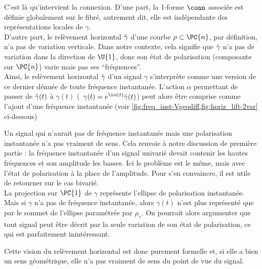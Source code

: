 C'est là qu'intervient la connexion. D'une part, la 1-forme $\conn$ associée est définie globalement sur le fibré, autrement dit, elle est indépendante des représentations locales de $\gamma$.
\\
D'autre part, le relèvement horizontal $\Tilde{\gamma}$ d'une courbe $\rho\subset\PC{n}$, par définition, n'a pas de variation verticale. Dans notre contexte, cela signifie que $\Tilde{\gamma}$ n'a pas de variation dans la direction de $\U{1}$, donc son état de polarisation (composante sur $\PC{n}$) varie mais pas ses ``fréquences''.
\\
Ainsi, le relèvement horizontal $\Tilde{\gamma}$ d'un signal $\gamma$ s'interprète comme une version de ce dernier dénuée de toute fréquence instantanée.
L'action $\alpha$ permettant de passer de $\Tilde{\gamma}(t)$ à $\gamma(t)$ (\ie~$\gamma(t) = e^{\i \alpha(t)} \Tilde{\gamma}(t)$) peut alors être comprise comme l'ajout d'une fréquence instantanée (voir \cref{fig:freq_inst-Vgeodiff,fig:horiz_lift-2var} ci-dessous)	
\\

\begin{remarque}
Un signal qui n'aurait pas de fréquence instantanée mais une polarisation instantanée n'a pas vraiment de sens. 
Cela renvoie à notre discussion de première partie : la fréquence instantanée d'un signal univarié devait contenir les hautes fréquences et son amplitude les basses.
Ici le problème est le même, mais avec l'état de polarisation à la place de l’amplitude. Pour s'en convaincre, il est utile de retourner sur le cas bivarié.
\\
La projection sur $\PC{1}$ de $\gamma$ représente l'ellipse de polarisation instantanée. 
Mais si $\gamma$ n'a pas de fréquence instantanée, alors $\gamma(t)$ n'est plus représenté que par le sommet de l’ellipse paramétrée par $\rho_\gamma$. 
On pourrait alors argumenter que tout signal peut être décrit par la seule variation de son état de polarisation, ce qui est parfaitement inintéressant.

Cette vision du relèvement horizontal est donc purement formelle et, si elle a bien un sens géométrique, elle n'a pas vraiment de sens du point de vue du signal.
\end{remarque}
\skipl

